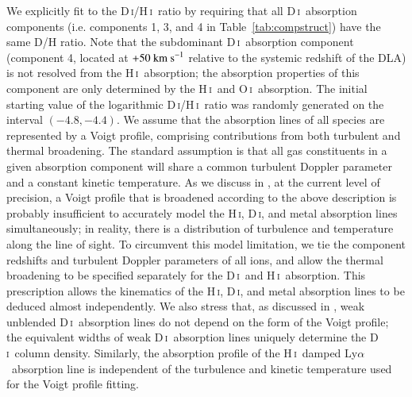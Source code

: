\documentclass[12pt,preprint,useAMS,usenatbib]{emulateapj}
\newcommand{\DI}{\textrm{D}\,\textsc{i}}
\newcommand{\HI}{\textrm{H}\,\textsc{i}}
\newcommand{\Lya}{Ly$\alpha$}
\newcommand{\OI}{O\,\textsc{i}}
\begin{document}
We explicitly fit to the \DI/\HI\ ratio by requiring that all \DI\ absorption components
(i.e. components 1, 3, and 4 in Table~\ref{tab:compstruct}) have the same D/H ratio.
Note that the subdominant \DI\ absorption component (component 4, located at
$+50~{\rm km~s}^{-1}$ relative to the systemic redshift of the DLA) is not resolved
from the \HI\ absorption; the absorption properties of this component are only
determined by the \HI\ and \OI\ absorption. The initial starting value
of the logarithmic \DI/\HI\ ratio was randomly generated on the interval $(-4.8,-4.4)$.
We assume that the absorption lines of all species are represented
by a Voigt profile, comprising contributions from both turbulent
and thermal broadening. The standard assumption is that all gas
constituents in a given absorption component will share a common
turbulent Doppler parameter and a constant kinetic temperature.
As we discuss in \citet{Coo14}, at the current level of precision, a
Voigt profile that is broadened according to the above description
is probably insufficient to accurately model the
\HI, \DI, and metal absorption lines simultaneously; in reality,
there is a distribution of turbulence and temperature along
the line of sight. To circumvent
this model limitation, we tie the component redshifts and turbulent
Doppler parameters of all ions, and allow the thermal broadening
to be specified separately for the \DI\ and \HI\ absorption.
This prescription allows the kinematics of the \HI, \DI, and metal
absorption lines to be deduced almost independently.
We also stress that, as discussed in \citet{Coo14}, weak
unblended \DI\ absorption lines do not depend on the form of the Voigt profile;
the equivalent widths of weak \DI\ absorption lines uniquely
determine the \DI\ column density. Similarly, the absorption profile
of the \HI\ damped \Lya\ absorption line is independent of the
turbulence and kinetic temperature used for the Voigt profile fitting.
\end{document}
